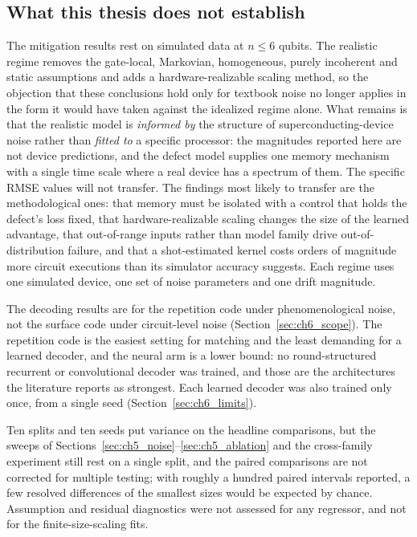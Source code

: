 \documentclass[Thesis.tex]{subfiles}
\begin{document}
\subsection{What this thesis does not establish}

The mitigation results rest on simulated data at $n \leq 6$ qubits. The realistic
regime removes the gate-local, Markovian, homogeneous, purely incoherent and static
assumptions and adds a hardware-realizable scaling method, so the objection that
these conclusions hold only for textbook noise no longer applies in the form it
would have taken against the idealized regime alone. What remains is that the
realistic model is \emph{informed by} the structure of superconducting-device noise
rather than \emph{fitted to} a specific processor: the magnitudes reported here are
not device predictions, and the defect model supplies one memory mechanism with a
single time scale where a real device has a spectrum of them. The specific RMSE
values will not transfer. The findings most likely to transfer are the
methodological ones: that memory must be isolated with a control that holds the
defect's loss fixed, that hardware-realizable scaling changes the size of the
learned advantage, that out-of-range inputs rather than model family drive
out-of-distribution failure, and that a shot-estimated kernel costs orders of
magnitude more circuit executions than its simulator accuracy suggests. Each regime
uses one simulated device, one set of noise parameters and one drift magnitude.

The decoding results are for the repetition code under phenomenological noise, not
the surface code under circuit-level noise (Section~\ref{sec:ch6_scope}). The
repetition code is the easiest
setting for matching and the least demanding for a learned decoder, and the neural
arm is a lower bound: no round-structured recurrent or convolutional decoder was
trained, and those are the architectures the literature reports as strongest. Each
learned decoder was also trained only once, from a single seed
(Section~\ref{sec:ch6_limits}).

Ten splits and ten seeds put variance on the headline comparisons, but the sweeps
of Sections~\ref{sec:ch5_noise}--\ref{sec:ch5_ablation} and the cross-family
experiment still rest on a single split, and the paired comparisons are not corrected
for multiple testing; with roughly a hundred paired intervals reported, a few
resolved differences of the smallest sizes would be expected by chance. Assumption
and residual diagnostics were not assessed for any regressor, and not for the
finite-size-scaling fits.
\end{document}
